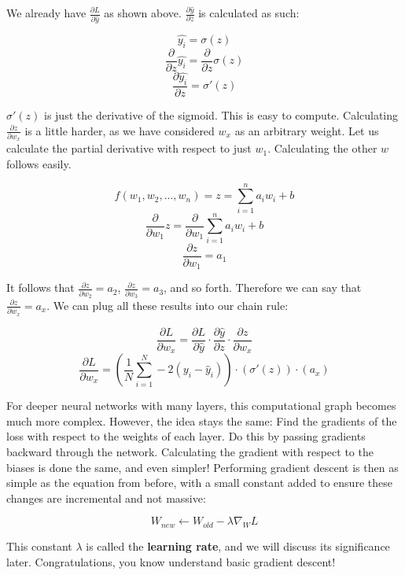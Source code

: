 \begin{flushleft}
    We already have $\frac{\partial L}{\partial\hat{y}}$ as shown above. $\frac{\partial \hat{y}}{\partial z}$ is calculated as such:

    $$\hat{y_i} = \sigma(z)$$
    $$\frac{\partial}{\partial z}\hat{y_i} = \frac{\partial}{\partial z} \sigma(z)$$
    $$\frac{\partial \hat{y_i}}{\partial z} = \sigma'(z)$$

    $\sigma'(z)$ is just the derivative of the sigmoid. This is easy to compute. Calculating $\frac{\partial z}{\partial w_x}$ is a little harder, as we have considered $w_x$ as an arbitrary weight. Let us calculate the partial derivative with respect to just $w_1$. Calculating the other $w$ follows easily. \break

    $$f(w_1, w_2,...,w_n) = z = \sum_{i=1}^n a_iw_i + b$$
    $$\frac{\partial}{\partial w_1}z = \frac{\partial}{\partial w_1}\sum_{i=1}^n a_iw_i + b$$
    $$\frac{\partial z}{\partial w_1} = a_1$$

    It follows that $\frac{\partial z}{\partial w_2} = a_2$, $\frac{\partial z}{\partial w_3} = a_3$, and so forth. Therefore we can say that $\frac{\partial z}{\partial w_x} = a_x$. We can plug all these results into our chain rule:

    $$\frac{\partial L}{\partial w_x} = \frac{\partial L}{\partial \hat{y}}\cdot\frac{\partial \hat{y}}{\partial z}\cdot\frac{\partial z}{\partial w_x}$$
    $$\frac{\partial L}{\partial w_x} =  (\frac{1}{N}\sum^{N}_{i=1} -2(y_i - \hat{y}_i)) \cdot (\sigma'(z)) \cdot (a_x)$$

    For deeper neural networks with many layers, this computational graph becomes much more complex. However, the idea stays the same: Find the gradients of the loss with respect to the weights of each layer. Do this by passing gradients backward through the network. Calculating the gradient with respect to the biases is done the same, and even simpler! Performing gradient descent is then as simple as the equation from before, with a small constant added to ensure these changes are incremental and not massive:

    $$W_{new} \leftarrow W_{old} - \lambda\nabla_W L$$

    This constant $\lambda$ is called the \textbf{learning rate}, and we will discuss its significance later. Congratulations, you know understand basic gradient descent!
\end{flushleft}

